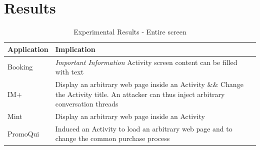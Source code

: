 \section{Results}
\label{sec:results}


\begin{table}[t]
\small
\centering
\renewcommand{\arraystretch}{1.3}

\parbox{.45\linewidth}{
  \centering
  \caption{Experimental Results - Entire screen}
  \label{table:1}
  \begin{tabular}{|l|p{5cm}|}%
    \hline
    Application & Implication \\ \hline
    Booking & \emph{Important Information} Activity screen content can be filled with text\\
    IM+ & Display an arbitrary web page inside an Activity \&\& Change the Activity title. An attacker can thus inject arbitrary conversation threads \\
    Mint & Display an arbitrary web page inside an Activity \\
    PromoQui & Induced an Activity to load an arbitrary web page and to change the common purchase process \\

\end{tabular}}
\end{table}
